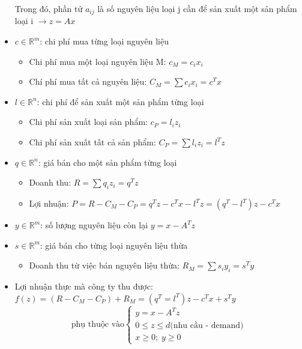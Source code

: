 \documentclass[a4paper]{article}
\begin{document}
\begin{itemize}
            Trong đó, phần tử $a_{ij}$ là số nguyên liệu loại j cần để sản xuất một sản phẩm loại i $\rightarrow z=Ax$
            \item $c \in \mathbb{R}^m$: chi phí mua từng loại nguyên liệu
                \begin{itemize}
                    \item Chi phí mua một loại nguyên liệu M: $c_M = c_i x_i$
                    \item Chí phí mua tất cả nguyên liệu: $C_M = \sum c_i x_i = c^T x$
                \end{itemize}
            \item $l \in \mathbb{R}^n$: chi phí để sản xuất một sản phẩm từng loại
                \begin{itemize}
                    \item Chi phí sản xuất loại sản phẩm: $c_P = l_i z_i$
                    \item Chi phí sản xuất tất cả sản phẩm: $C_P = \sum l_i z_i = l^T z$
                \end{itemize}
            \item $q \in \mathbb{R}^n$: giá bán cho một sản phẩm từng loại
                \begin{itemize}
                    \item Doanh thu: $R = \sum q_i z_i = q^T z$
                    \item Lợi nhuận: $P = R - C_M - C_P = q^Tz - c^Tx - l^Tz = (q^T - l^T)z - c^Tx$
                \end{itemize}
            \item $y \in \mathbb{R}^m$: số lượng nguyên liệu còn lại $y = x - A^Tz$
            \item $s \in \mathbb{R}^m$: giá bán cho từng loại nguyên liệu thừa
                \begin{itemize}
                    \item Doanh thu từ việc bán nguyên liệu thừa: $R_M = \sum s_iy_i = s^Ty$
                \end{itemize}
            \item Lợi nhuận thực mà công ty thu được: $f(z) = (R - C_M - C_P) + R_M = (q^T = l^T)z - c^Tx + s^Ty$\\
                \begin{displaymath}
                    \text{phụ thuộc vào}
                    \begin{cases}
                        y = x - A^Tz\\
                        0 \leq z \leq d \text{(nhu cầu - demand)}\\
                        x \geq 0; \; y \geq 0
                    \end{cases}
                \end{displaymath}
        \end{itemize}
\end{document}
